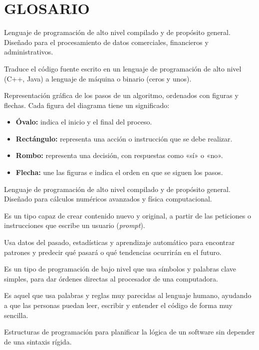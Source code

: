 \documentclass[12pt,letterpaper]{article}
\newenvironment{glosario}{\begin{description}[leftmargin=0pt,labelindent=0pt,itemsep=4pt,font=\normalfont\bfseries]\singlespacing}{\end{description}}
\begin{document}
\section{GLOSARIO}
\begin{glosario}
 \item[COBOL:] Lenguaje de programación de alto nivel compilado y de propósito general. Diseñado para el procesamiento de datos comerciales, financieros y administrativos.
\item[Compilador:] Traduce el código fuente escrito en un lenguaje de programación de alto nivel (C++, Java) a lenguaje de máquina o binario (ceros y unos).
\item[Diagrama de flujo:] Representación gráfica de los pasos de un algoritmo, ordenados con figuras y flechas. Cada figura del diagrama tiene un significado:
\begin{itemize}[leftmargin=1.27cm,itemsep=0pt]
\item \textbf{Óvalo:} indica el inicio y el final del proceso.
\item \textbf{Rectángulo:} representa una acción o instrucción que se debe realizar.
\item \textbf{Rombo:} representa una decisión, con respuestas como «sí» o «no».
\item \textbf{Flecha:} une las figuras e indica el orden en que se siguen los pasos.
\end{itemize}
\item[FORTRAN:] Lenguaje de programación de alto nivel compilado y de propósito general. Diseñado para cálculos numéricos avanzados y física computacional.
\item[Inteligencia artificial generativa:] Es un tipo capaz de crear contenido nuevo y original, a partir de las peticiones o instrucciones que escribe un usuario (\textit{prompt}).
\item[Inteligencia artificial predictiva:] Usa datos del pasado, estadísticas y aprendizaje automático para encontrar patrones y predecir qué pasará o qué tendencias ocurrirán en el futuro.
\item[Lenguaje ensamblador:] Es un tipo de programación de bajo nivel que usa símbolos y palabras clave simples, para dar órdenes directas al procesador de una computadora.
\item[Lenguajes de programación de alto nivel:] Es aquel que usa palabras y reglas muy parecidas al lenguaje humano, ayudando a que las personas puedan leer, escribir y entender el código de forma muy sencilla.
\item[Pseudocódigo:] Estructuras de programación para planificar la lógica de un software sin depender de una sintaxis rígida.

\end{glosario}
\end{document}
